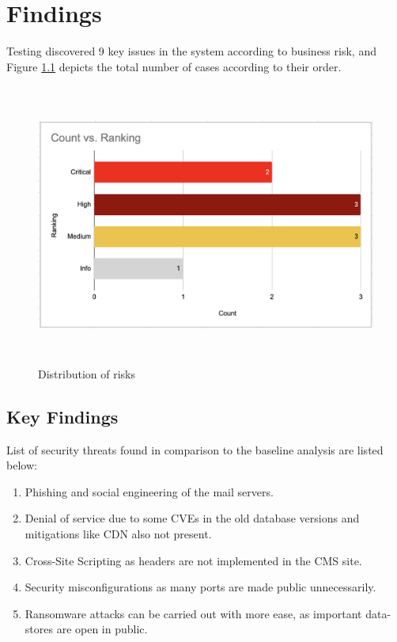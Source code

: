 \chapter{Findings}
Testing discovered 9 key issues in the system according to business risk, and Figure \ref{fig:bar_rankings} depicts the total number of cases according to their order.

\newline
\newline
\newline
\newline
\begin{figure}[h!]
\centering
\includegraphics[width=\textwidth, height=350px]{pics/rankings.png}
\caption{Distribution of risks}\label{fig:bar_rankings}
\end{figure}


\newpage
\section{Key Findings}

List of security threats found in comparison to the baseline analysis are listed below:

\begin{enumerate}
    \item Phishing and social engineering of the mail servers.
    \item Denial of service due to some CVEs in the old database versions and mitigations like CDN also not present.
    \item Cross-Site Scripting as headers are not implemented in the CMS site.
    \item Security misconfigurations as many ports are made public unnecessarily.
    \item Ransomware attacks can be carried out with more ease, as important data-stores are open in public.
\end{enumerate}

